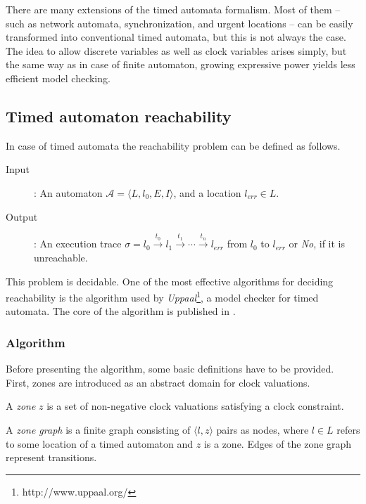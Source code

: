 There are many extensions of the timed automata formalism. Most of them -- such as network automata, synchronization, and urgent locations -- can be easily transformed into conventional timed automata, but this is not always the case. The idea to allow discrete variables as well as clock variables arises simply, but the same way as in case of finite automaton, growing expressive power yields less efficient model checking.


\subsection{Timed automaton reachability} \label{sec:tareach}

In case of timed automata the reachability problem can be defined as follows.

\begin{description}
	\item [Input]: An automaton $\mathcal{A}=\langle L, l_0,
	E, I\rangle$, and a location $l_{err} \in L$.
	\item[Output]: An execution trace $\sigma=l_0 \xrightarrow{t_0} l_1 \xrightarrow{t_1} \cdots \xrightarrow{t_n} l_{err}$ from $l_0$ to $l_{err}$ or \emph{No}, if it is unreachable.
\end{description}

This problem is decidable. One of the most effective algorithms for deciding reachability is the algorithm used by \emph{Uppaal}\footnote{http://www.uppaal.org/}, a model checker for timed automata. The core of the algorithm is published in \cite{bengtsson2004timed}.
\subsubsection{Algorithm}

Before presenting the algorithm, some basic definitions have to be provided. First, zones are introduced as an abstract domain for clock valuations.

\begin{dfn}
	A \emph{zone} $z$ is a set of non-negative clock valuations satisfying a clock constraint.
\end{dfn}


\begin{dfn}
	A \emph{zone graph} is a finite graph consisting of $\langle l,z \rangle$ pairs as nodes, where $l \in L$ refers to some location of a timed automaton and $z$ is a zone. Edges of the zone graph represent transitions. 
\end{dfn}

